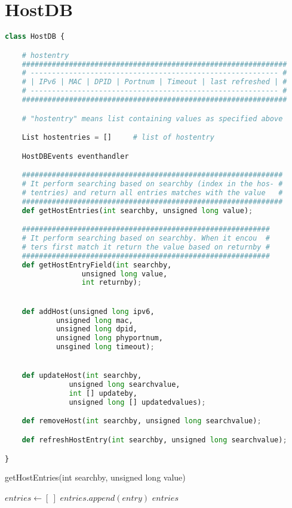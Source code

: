 \documentclass[10pt,a4paper,titlepage]{report}
\begin{document}
	\section{HostDB}
		\begin{lstlisting}[language=Python]
class HostDB {

    # hostentry
    ##############################################################
    # ---------------------------------------------------------- #
    # | IPv6 | MAC | DPID | Portnum | Timeout | last refreshed | #
    # ---------------------------------------------------------- #
    ##############################################################

	# "hostentry" means list containing values as specified above

	List hostentries = []	  # list of hostentry

	HostDBEvents eventhandler

	#############################################################
	# It perform searching based on searchby (index in the hos- #
	# tentries) and return all entries matches with the value   #
	#############################################################
	def getHostEntries(int searchby, unsigned long value);

	##########################################################
	# It perform searching based on searchby. When it encou  #
	# ters first match it return the value based on returnby #
	##########################################################
	def getHostEntryField(int searchby, 
			      unsigned long value, 
			      int returnby);


	def addHost(unsigned long ipv6, 
		    unsigned long mac, 
		    unsigned long dpid, 
		    unsigned long phyportnum, 
		    unsgined long timeout);


	def updateHost(int searchby, 
		       unsigned long searchvalue,
		       int [] updateby,
		       unsigned long [] updatedvalues);

	def removeHost(int searchby, unsigned long searchvalue);

	def refreshHostEntry(int searchby, unsigned long searchvalue);

}
		\end{lstlisting}

			\begin{algorithm}
				\caption{getHostEntries(int searchby, unsigned long value)}
				\begin{algorithmic}[1]
					\STATE $entries \leftarrow [\ ]$
							\STATE $entries.append(entry)$
						\ENDIF
					\ENDFOR
					\RETURN $entries$
				\end{algorithmic}
			\end{algorithm}
			
\end{document}

